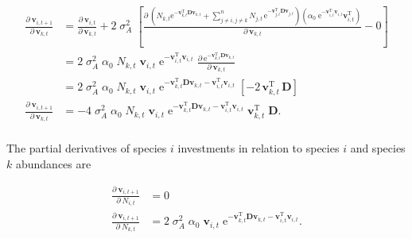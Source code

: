 \begin{equation*}
\begin{split}
    \frac{ \partial \: \mathbf{v}_{i,t+1} }{ \partial \: \mathbf{v}_{k,t} } &=
        \frac{ \partial \: \mathbf{v}_{i,t} }{ \partial \: \mathbf{v}_{k,t} } +
        2 \; \sigma_A^2 \;
        \left[
            \frac{ \partial \:
                \left(
                    N_{k,t} \textrm{e}^{- \mathbf{v}_{k,t}^{\textrm{T}} \mathbf{D}
                    \mathbf{v}_{k,t}} + 
                    \sum_{j \ne i, j \ne k}^{n}{ N_{j,t} \, \textrm{e}^{
                        - \mathbf{v}_{j,t}^{\textrm{T}}
                        \mathbf{D} \mathbf{v}_{j,t} } }
                \right)
                \left(
                    \alpha_0 \; \textrm{e}^{ - \mathbf{v}_{i,t}^{\textrm{T}}
                    \mathbf{v}_{i,t} } \mathbf{v}_{i,t}^{\textrm{T}}
                \right)
            }{ \partial \:  \mathbf{v}_{k,t} } -
            0
        \right] \\
    &= 2 \; \sigma_A^2 \; \alpha_0 \; N_{k,t} \; \mathbf{v}_{i,t} \;
        \textrm{e}^{ - \mathbf{v}_{i,t}^{\textrm{T}}
        \mathbf{v}_{i,t} } \; 
        \frac{ \partial \:
                \textrm{e}^{
                    - \mathbf{v}_{k,t}^{\textrm{T}} \mathbf{D} \mathbf{v}_{k,t}
                    }
            }{ \partial \:  \mathbf{v}_{k,t} } \\
    &= 2 \; \sigma_A^2 \; \alpha_0 \; N_{k,t} \; \mathbf{v}_{i,t} \;
        \textrm{e}^{
                    - \mathbf{v}_{k,t}^{\textrm{T}} \mathbf{D} \mathbf{v}_{k,t}
                    - \mathbf{v}_{i,t}^{\textrm{T}} \mathbf{v}_{i,t}
                } \;
        \left[ 
            - 2 \, \mathbf{v}_{k,t}^{\textrm{T}} \, \mathbf{D}
        \right] \\
    \frac{ \partial \: \mathbf{v}_{i,t+1} }{ \partial \: \mathbf{v}_{k,t}} &=
        -4 \; \sigma_A^2 \; \alpha_0 \; N_{k,t} \; \mathbf{v}_{i,t} \;
        \textrm{e}^{
                    - \mathbf{v}_{k,t}^{\textrm{T}} \mathbf{D} \mathbf{v}_{k,t}
                    - \mathbf{v}_{i,t}^{\textrm{T}} \mathbf{v}_{i,t}
                } \;
        \mathbf{v}_{k,t}^{\textrm{T}} \; \mathbf{D}
    \textrm{.} \\
\end{split}
\end{equation*}

The partial derivatives of species $i$ investments in relation to species $i$ 
and species $k$ abundances are

\begin{equation*}
\begin{split}
    \frac{ \partial \: \mathbf{v}_{i,t+1} }{ \partial \: N_{i,t} } &= 0 \\
    \frac{ \partial \: \mathbf{v}_{i,t+1} }{ \partial \: N_{k,t} } &=
        2 \; \sigma_A^2 \; \alpha_0 \; \mathbf{v}_{i,t} \;
        \textrm{e}^{ - \mathbf{v}_{k,t}^{\textrm{T}} \mathbf{D} \mathbf{v}_{k,t}
            - \mathbf{v}_{i,t}^{\textrm{T}} \mathbf{v}_{i,t} }
    \textrm{.} \\
\end{split}
\end{equation*}





